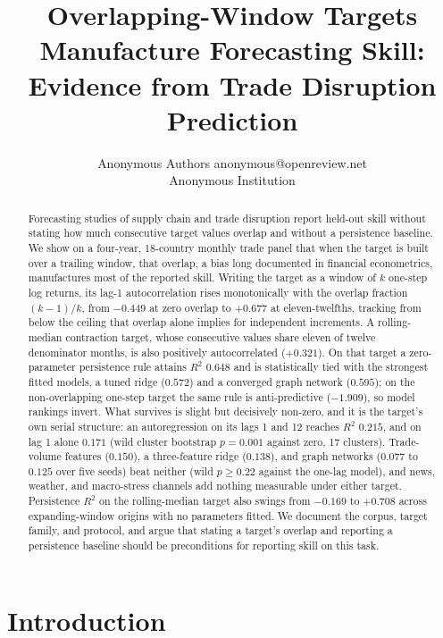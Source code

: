 \documentclass[10pt]{article}
\title{Overlapping-Window Targets Manufacture Forecasting Skill:\\ Evidence from Trade Disruption Prediction}
\author{\name Anonymous Authors \email anonymous@openreview.net \\
\addr Anonymous Institution}
\begin{document}
\maketitle

\begin{abstract}
Forecasting studies of supply chain and trade disruption report held-out skill without stating how much consecutive target values overlap and without a persistence baseline. We show on a four-year, 18-country monthly trade panel that when the target is built over a trailing window, that overlap, a bias long documented in financial econometrics, manufactures most of the reported skill. Writing the target as a window of $k$ one-step log returns, its lag-1 autocorrelation rises monotonically with the overlap fraction $(k-1)/k$, from $-0.449$ at zero overlap to $+0.677$ at eleven-twelfths, tracking from below the ceiling that overlap alone implies for independent increments. A rolling-median contraction target, whose consecutive values share eleven of twelve denominator months, is also positively autocorrelated ($+0.321$). On that target a zero-parameter persistence rule attains $R^2$ $0.648$ and is statistically tied with the strongest fitted models, a tuned ridge ($0.572$) and a converged graph network ($0.595$); on the non-overlapping one-step target the same rule is anti-predictive ($-1.909$), so model rankings invert. What survives is slight but decisively non-zero, and it is the target's own serial structure: an autoregression on its lags 1 and 12 reaches $R^2$ $0.215$, and on lag 1 alone $0.171$ (wild cluster bootstrap $p=0.001$ against zero, 17 clusters). Trade-volume features ($0.150$), a three-feature ridge ($0.138$), and graph networks ($0.077$ to $0.125$ over five seeds) beat neither (wild $p \ge 0.22$ against the one-lag model), and news, weather, and macro-stress channels add nothing measurable under either target. Persistence $R^2$ on the rolling-median target also swings from $-0.169$ to $+0.708$ across expanding-window origins with no parameters fitted. We document the corpus, target family, and protocol, and argue that stating a target's overlap and reporting a persistence baseline should be preconditions for reporting skill on this task.
\end{abstract}

\section{Introduction}
\label{sec:intro}
\end{document}
